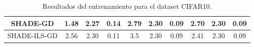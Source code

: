 \begin{table}[H]
{\begin{tabular}{|c|ccc|ccc|ccc|}
SHADE-GD                                          & \multicolumn{1}{c|}{1.48}          & \multicolumn{1}{c|}{2.27}          & 0.14          & \multicolumn{1}{c|}{2.79}          & \multicolumn{1}{c|}{2.30}          & 0.09          & \multicolumn{1}{c|}{2.70}          & \multicolumn{1}{c|}{2.30}          & 0.09         \\ \hline
SHADE-ILS-GD                                      & \multicolumn{1}{c|}{2.56}          & \multicolumn{1}{c|}{2.30}          & 0.11          & \multicolumn{1}{c|}{3.5}           & \multicolumn{1}{c|}{2.30}          & 0.09          & \multicolumn{1}{c|}{2.41}          & \multicolumn{1}{c|}{2.30}          & 0.09         \\ \hline
\end{tabular}}
\caption{Resultados del entrenamiento para el dataset CIFAR10.}
\label{tab:cifar10}
\end{table}
